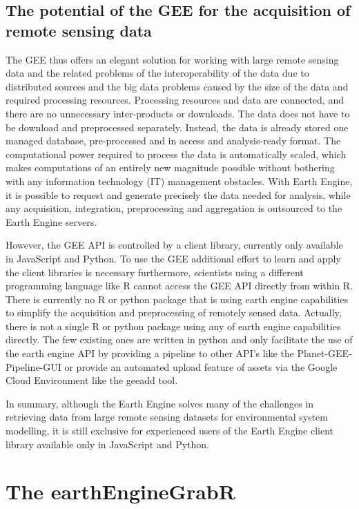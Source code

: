 \documentclass[12pt,twoside,a4paper,final]{report}
\begin{document}
\subsection{The potential of the GEE for the acquisition of remote sensing data}

The GEE thus offers an elegant solution for working with large remote sensing data and the related problems of the interoperability of the data due to distributed sources and the big data problems caused by the size of the data and required processing resources. 
Processing resources and data are connected, and there are no unnecessary inter-products or downloads. 
The data does not have to be download and preprocessed separately. Instead, the data is already stored one managed database, pre-processed and in access and analysis-ready format. 
The computational power required to process the data is automatically scaled, which makes computations of an entirely new magnitude possible without bothering with any information technology (IT) management obstacles.
With Earth Engine, it is possible to request and generate precisely the data needed for analysis, while any acquisition, integration, preprocessing and aggregation is outsourced to the Earth Engine servers. 

However, the GEE API is controlled by a client library, currently only available in JavaScript and Python. To use the GEE additional effort to learn and apply the client libraries is necessary furthermore, scientists using a different programming language like R cannot access the GEE API directly from within R.
There is currently no R or python package that is using earth engine capabilities to simplify the acquisition and preprocessing of remotely sensed data. Actually, there is not a single R or python package using any of earth engine capabilities directly. The few existing ones are written in python and only facilitate the use of the earth engine API by providing a pipeline to other API's like the Planet-GEE-Pipeline-GUI or provide an automated upload feature of assets via the Google Cloud Environment like the geeadd tool.

In summary, although the Earth Engine solves many of the challenges in retrieving data from large remote sensing datasets for environmental system modelling, it is still exclusive for experienced users of the Earth Engine client library available only in JavaScript and Python.

\section{The earthEngineGrabR}
\end{document}
